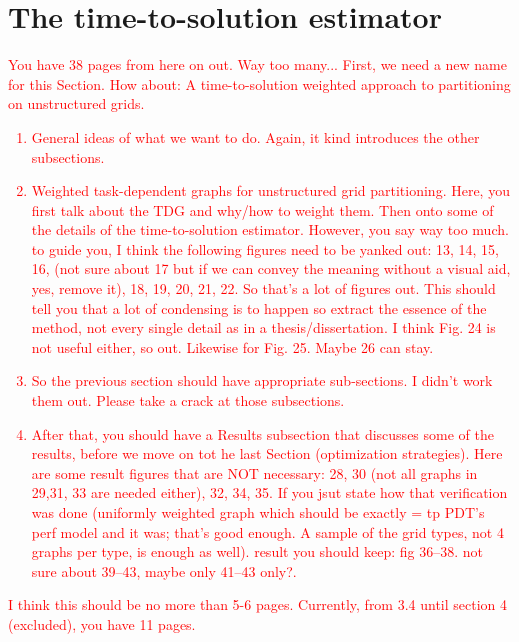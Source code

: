\documentclass[times,final]{elsarticle}
\newcommand{\tcr}[1]{\textcolor{red}{#1}}
\begin{document}
\section{The time-to-solution estimator}\label{cha:tts}
\tcr{You have 38 pages from here on out. Way too many... First, we need a new name for this Section. How about: A time-to-solution weighted approach to partitioning on unstructured grids.
\begin{enumerate}
\item General ideas of what we want to do. Again, it kind introduces the other subsections.
\item Weighted task-dependent graphs for unstructured grid partitioning. Here, you first talk about the TDG and why/how to weight them. Then onto some of the details of the time-to-solution estimator. However, you say way too much. to guide you, I think the following figures need to be yanked out: 13, 14, 15, 16, (not sure about 17 but if we can convey the meaning without a visual aid, yes, remove it), 18, 19, 20, 21, 22. So that's a lot of figures out. This should tell you that a lot of condensing is to happen so extract the essence of the method, not every single detail as in a thesis/dissertation. I think Fig. 24 is not useful either, so out. Likewise for Fig. 25. Maybe 26 can stay. 
\item So the previous section should have appropriate sub-sections. I didn't work them out. Please take a crack at those subsections.
\item After that, you should have a Results subsection that discusses some of the results, before we move on tot he last Section (optimization strategies). Here are some result figures that are NOT necessary: 28, 30 (not all graphs in 29,31, 33 are needed either), 32, 34, 35. If you jsut state how that verification was done (uniformly weighted graph which should be exactly = tp PDT's perf model and it was; that's good enough. A sample of the grid types, not 4 graphs per type, is enough as well). result you should keep: fig 36--38. not sure about 39--43, maybe only 41--43 only?.  
\end{enumerate}
I think this should be no more than 5-6 pages. Currently, from 3.4 until section 4 (excluded), you have 11 pages.
}
\end{document}

